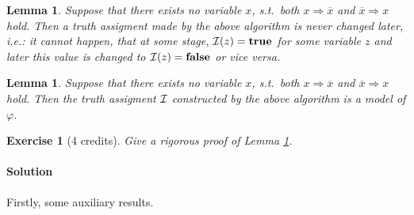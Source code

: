 \documentclass [11pt]{article}
\newcommand{\Ra}{\Rightarrow}
\renewcommand{\phi}{\varphi}
\def\II{{\cal I}}
\newcommand{\True}{\mathbf{true}}
\newcommand{\False}{\mathbf{false}}
\def\ox{\overline{x}}
\newtheorem{lemma}[theorem]{Lemma}
\newtheorem{exercise}[theorem]{Exercise}
\begin{document}
\begin{lemma}
\label{lem:1}
Suppose that there exists no
variable $x$, s.t.\ both $x \Ra \ox$ and $\ox \Ra x$ hold.
Then a truth assigment made by the above algorithm is never changed later, i.e.: it cannot happen, that at some stage, 
$\II (z) =\True$ for some variable $z$ and later this value is changed to 
$\II (z) =\False$ or vice versa.
\end{lemma}



\begin{lemma}
\label{lem:2}
Suppose that there exists no
variable $x$, s.t.\ both $x \Ra \ox$ and $\ox \Ra x$ hold.
Then the truth assigment $\II$ constructed by the above algorithm
is a model of $\phi$.
\end{lemma}

\smallskip

\newpage

\noindent
\begin{exercise}[4 credits]
{\em Give a rigorous proof of Lemma \ref{lem:1}.
}%
\end{exercise}

\noindent
\paragraph*{Solution}

Firstly, some auxiliary results.
\end{document}
